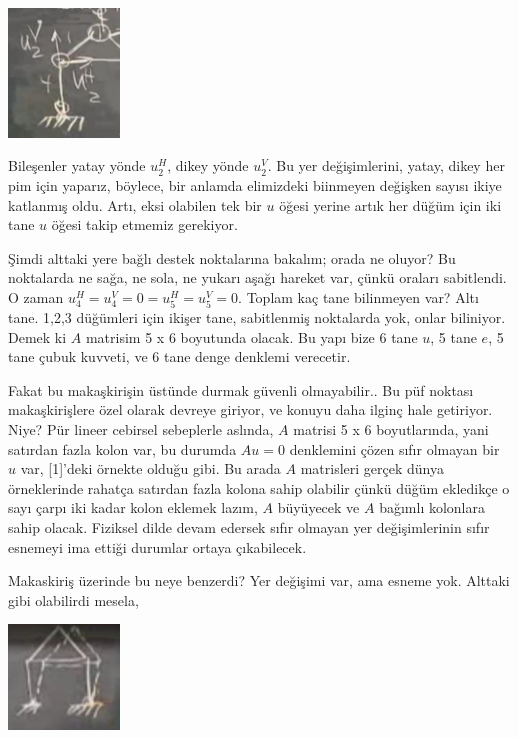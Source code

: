 \documentclass[12pt,fleqn]{article}\usepackage{../../common}
\begin{document}
\includegraphics[width=8em]{compscieng_1_15_02.png}

Bileşenler yatay yönde $u_2^H$, dikey yönde $u_2^V$. Bu yer değişimlerini,
yatay, dikey her pim için yaparız, böylece, bir anlamda elimizdeki biinmeyen
değişken sayısı ikiye katlanmış oldu. Artı, eksi olabilen tek bir $u$ öğesi
yerine artık her düğüm için iki tane $u$ öğesi takip etmemiz gerekiyor.

Şimdi alttaki yere bağlı destek noktalarına bakalım; orada ne oluyor?  Bu
noktalarda ne sağa, ne sola, ne yukarı aşağı hareket var, çünkü oraları
sabitlendi. O zaman $u_4^H = u_4^V = 0 = u_5^H = u_5^V = 0$.  Toplam kaç tane
bilinmeyen var? Altı tane. 1,2,3 düğümleri için ikişer tane, sabitlenmiş
noktalarda yok, onlar biliniyor. Demek ki $A$ matrisim 5 x 6 boyutunda olacak.
Bu yapı bize 6 tane $u$, 5 tane $e$, 5 tane çubuk kuvveti, ve 6 tane denge
denklemi verecetir.

Fakat bu makaşkirişin üstünde durmak güvenli olmayabilir.. Bu püf noktası
makaşkirişlere özel olarak devreye giriyor, ve konuyu daha ilginç hale
getiriyor. Niye? Pür lineer cebirsel sebeplerle aslında, $A$ matrisi 5 x 6
boyutlarında, yani satırdan fazla kolon var, bu durumda $A u = 0$ denklemini
çözen sıfır olmayan bir $u$ var, [1]'deki örnekte olduğu gibi. Bu arada $A$
matrisleri gerçek dünya örneklerinde rahatça satırdan fazla kolona sahip
olabilir çünkü düğüm ekledikçe o sayı çarpı iki kadar kolon eklemek lazım, $A$
büyüyecek ve $A$ bağımlı kolonlara sahip olacak. Fiziksel dilde devam edersek
sıfır olmayan yer değişimlerinin sıfır esnemeyi ima ettiği durumlar ortaya
çıkabilecek.

Makaskiriş üzerinde bu neye benzerdi? Yer değişimi var, ama esneme yok.  Alttaki
gibi olabilirdi mesela,

\includegraphics[width=8em]{compscieng_1_15_03.png}
\end{document}
